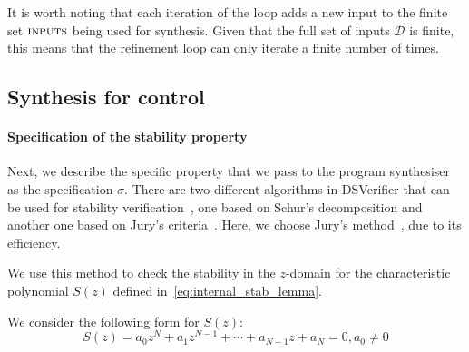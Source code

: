 \documentclass{sig-alternate-05-2015}
\newcommand{\blue}[1]{{\color{blue}#1}}
\newcommand{\red}[1]{{\color{red}#1}}
\begin{document}

It is
worth noting that each iteration of the loop adds a new input to the
finite set $\text{\sc inputs}$ being used for synthesis.  Given that
the full set of inputs $\mathcal{D}$
is finite, this means that the refinement loop
can only iterate a finite number of times.

\subsection{Synthesis for control}
\label{synthesis-elements}

\paragraph{Specification of the stability property}

Next, we describe the specific property that we pass to the program
synthesiser as the specification $\sigma$.  There are two different
algorithms in DSVerifier that can be used for stability
verification~\cite{daes20161,Bessa16}, one based on
Schur's decomposition and another one based on Jury's
criteria~\cite{astrom1997computer}.  Here, we choose Jury's
method~\cite{astrom1997computer}, due to its efficiency.

We use this method to check the stability in the $z$-domain for the
characteristic polynomial $S(z)$ defined
in~\eqref{eq:internal_stab_lemma}.

%
We consider the following form for $S(z)$:
%
$$
S(z) = a_0z^N+a_1z^{N-1}+\cdots+a_{N-1}z+a_N=0, a_0\neq0
$$
%
\end{document}

